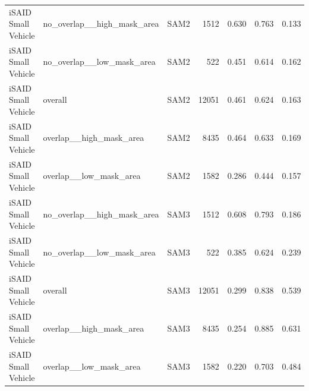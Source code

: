 \begin{tabular}{lllrrrr}
iSAID Small Vehicle & no\_overlap\_\_high\_mask\_area & SAM2 & 1512 & 0.630 & 0.763 & 0.133 \\
iSAID Small Vehicle & no\_overlap\_\_low\_mask\_area & SAM2 & 522 & 0.451 & 0.614 & 0.162 \\
iSAID Small Vehicle & overall & SAM2 & 12051 & 0.461 & 0.624 & 0.163 \\
iSAID Small Vehicle & overlap\_\_high\_mask\_area & SAM2 & 8435 & 0.464 & 0.633 & 0.169 \\
iSAID Small Vehicle & overlap\_\_low\_mask\_area & SAM2 & 1582 & 0.286 & 0.444 & 0.157 \\
iSAID Small Vehicle & no\_overlap\_\_high\_mask\_area & SAM3 & 1512 & 0.608 & 0.793 & 0.186 \\
iSAID Small Vehicle & no\_overlap\_\_low\_mask\_area & SAM3 & 522 & 0.385 & 0.624 & 0.239 \\
iSAID Small Vehicle & overall & SAM3 & 12051 & 0.299 & 0.838 & 0.539 \\
iSAID Small Vehicle & overlap\_\_high\_mask\_area & SAM3 & 8435 & 0.254 & 0.885 & 0.631 \\
iSAID Small Vehicle & overlap\_\_low\_mask\_area & SAM3 & 1582 & 0.220 & 0.703 & 0.484 \\
\bottomrule
\end{tabular}
